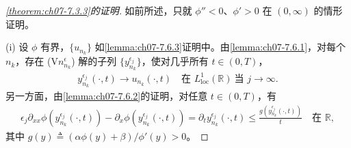 \documentclass[../../main.tex]{subfiles}%
\begin{document}
\begin{proof}[\cref{theorem:ch07-7.3.3}的证明]
如前所述，只就 $\phi''<0$、$\phi'>0$ 在 $(0,\infty)$ 的情形证明。

(i) 设 $\phi$ 有界，$\{u_{n_k}\}$ 如\cref{lemma:ch07-7.6.3}证明中。由\cref{lemma:ch07-7.6.1}，对每个 $n_k$，存在 (V$n_{n_k}^\epsilon$) 解的子列 $\{y_{n_k}^{\epsilon_j}\}$，使对几乎所有 $t\in(0,T)$，
\begin{align}
y_{n_k}^{\epsilon_j}(\cdot,t)\to u_{n_k}(\cdot,t)\quad\text{在 }L^1_{\mathrm{loc}}(\mathbb{R})\ \text{当 }j\to\infty. \label{align:ch07-7.168}
\end{align}
另一方面，由\cref{lemma:ch07-7.6.2}的证明，对任意 $t\in(0,T)$，有
\begin{align}
\epsilon_j\partial_{xx}\phi(y_{n_k}^{\epsilon_j}(\cdot,t))-\partial_x\phi(y_{n_k}^{\epsilon_j}(\cdot,t))
=\partial_t y_{n_k}^{\epsilon_j}(\cdot,t)\leqslant\frac{g(y_{n_k}^{\epsilon_j}(\cdot,t))}{t}\quad\text{在 }\mathbb{R}, \label{align:ch07-7.169}
\end{align}
其中 $g(y)\triangleq (\alpha\phi(y)+\beta)/\phi'(y)>0$。


\end{proof}
\end{document}
